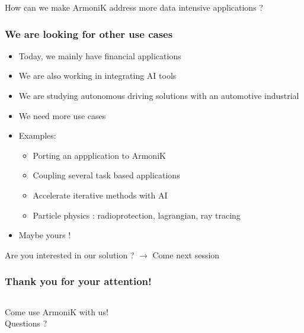 \documentclass[10pt,aspectratio=1609]{beamer}
\begin{document}
\begin{section}{How can we make ArmoniK address more data intensive applications ?}
  \begin{frame}
    \frametitle{We are looking for other use cases}
    \begin{itemize}
      \item Today, we mainly have financial applications
      \item We are also working in integrating AI tools
      \item We are studying autonomous driving solutions with an automotive industrial
      \item We need more use cases
      \item Examples:
      \begin{itemize}
        \item Porting an appplication to ArmoniK
        \item Coupling several task based applications
        \item Accelerate iterative methods with AI
        \item Particle physics : radioprotection, lagrangian, ray tracing
      \end{itemize}
      \item Maybe yours !
    \end{itemize}
  \end{frame}

\end{section}

\begin{section}{Are you interested in our solution ? $\rightarrow$ Come next session}
  \begin{frame}
    \frametitle{Thank you for your attention!}
    \begin{columns}
      \begin{column}{0.27\textwidth}
        Come use ArmoniK with us!
        \\
        Questions ?
      \end{column}
      \begin{column}{0.71\textwidth}
        \centering
        \scriptsize
        \begin{minipage}[t][\textheight][t]{\textwidth}
          
        \end{minipage}
      \end{column}
    \end{columns}
  \end{frame}
\end{section}
\end{document}
